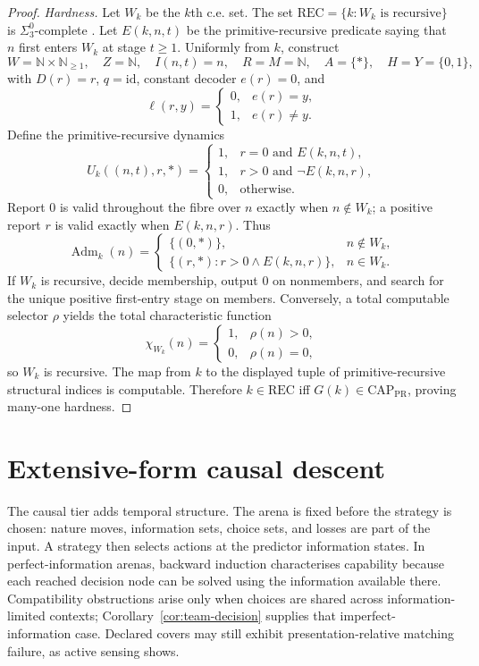 \documentclass[11pt]{article}
\theoremstyle{plain}
\theoremstyle{definition}
\theoremstyle{remark}
\newcommand{\N}{\mathbb{N}}
\newcommand{\Adm}{\operatorname{Adm}}
\begin{document}
\begin{proof}
\emph{Hardness.} Let $W_k$ be the $k$th c.e. set. The set
$\mathrm{REC}=\{k:W_k\text{ is recursive}\}$ is $\Sigma^0_3$-complete
\cite{soare}. Let $E(k,n,t)$ be the primitive-recursive predicate saying that
$n$ first enters $W_k$ at stage $t\ge1$. Uniformly from $k$, construct
\[
W=\N\times\N_{\ge1},\quad Z=\N,\quad I(n,t)=n,
\quad R=M=\N,\quad A=\{\ast\},\quad H=Y=\{0,1\},
\]
with $D(r)=r$, $q=\mathrm{id}$, constant decoder $e(r)=0$, and
\[
\ell(r,y)=
\begin{cases}0,&e(r)=y,\\1,&e(r)\ne y.\end{cases}
\]
Define the primitive-recursive dynamics
\[
U_k((n,t),r,\ast)=
\begin{cases}
1,&r=0\text{ and }E(k,n,t),\\
1,&r>0\text{ and }\neg E(k,n,r),\\
0,&\text{otherwise}.
\end{cases}
\]
Report $0$ is valid throughout the fibre over $n$ exactly when
$n\notin W_k$; a positive report $r$ is valid exactly when $E(k,n,r)$. Thus
\[
\Adm_k(n)=
\begin{cases}
\{(0,\ast)\},&n\notin W_k,\\
\{(r,\ast):r>0\land E(k,n,r)\},&n\in W_k.
\end{cases}
\]
If $W_k$ is recursive, decide membership, output $0$ on nonmembers, and search
for the unique positive first-entry stage on members. Conversely, a total
computable selector $\rho$ yields the total characteristic function
\[
\chi_{W_k}(n)=
\begin{cases}1,&\rho(n)>0,\\0,&\rho(n)=0,\end{cases}
\]
so $W_k$ is recursive. The map from $k$ to the displayed tuple of
primitive-recursive structural indices is computable. Therefore
$k\in\mathrm{REC}$ iff $G(k)\in\mathrm{CAP}_{\mathrm{PR}}$, proving many-one
hardness.
\end{proof}

\section{Extensive-form causal descent}\label{sec:feedback}

The causal tier adds temporal structure. The arena is fixed before the strategy
is chosen: nature moves, information sets, choice sets, and losses are part of
the input. A strategy then selects actions at the predictor information states.
In perfect-information arenas, backward induction characterises capability
because each reached decision node can be solved using the information available
there. Compatibility obstructions arise only when choices are shared across
information-limited contexts; Corollary~\ref{cor:team-decision} supplies that
imperfect-information case. Declared covers may still exhibit
presentation-relative matching failure, as active sensing shows.
\end{document}
